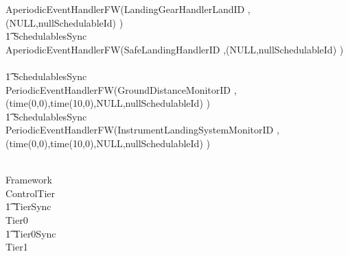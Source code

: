 \begin{circus}
\circblockopen
			AperiodicEventHandlerFW(LandingGearHandlerLandID ,(NULL,nullSchedulableId)   )\\
			\t1 \lpar SchedulablesSync \rpar\\
			AperiodicEventHandlerFW(SafeLandingHandlerID ,(NULL,nullSchedulableId)   )\\
\circblockclose \\


\t1 \lpar SchedulablesSync \rpar\\



\circblockopen
			PeriodicEventHandlerFW(GroundDistanceMonitorID ,(time(0,0),time(10,0),NULL,nullSchedulableId)   )\\
			\t1 \lpar SchedulablesSync \rpar\\
			PeriodicEventHandlerFW(InstrumentLandingSystemMonitorID ,(time(0,0),time(10,0),NULL,nullSchedulableId)   )\\
\circblockclose \\

		\circblockclose
\circblockclose
\end{circus}
%
%
%
\begin{circus}
\circprocess Framework \circdef \\
\circblockopen
ControlTier \\
\t1 \lpar TierSync \rpar \\
 \circblockopen
Tier0
\\ \t1 \lpar Tier0Sync \rpar \\
Tier1
\circblockclose
\circblockclose
\end{circus}
%
%
